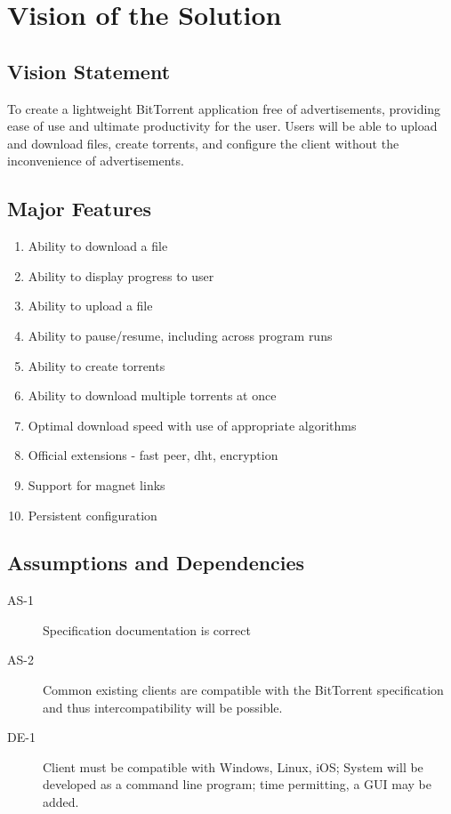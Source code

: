\documentclass[letter]{scrartcl}
\begin{document}
\section{Vision of the Solution}
\subsection{Vision Statement}
To create a lightweight BitTorrent application free of advertisements, providing ease of use and ultimate productivity for the user.  Users will be able to upload and download files, create torrents, and configure the client without the inconvenience of advertisements.
\subsection{Major Features}
\begin{enumerate}
\item Ability to download a file
\item Ability to display progress to user
\item Ability to upload a file
\item Ability to pause/resume, including across program runs
\item Ability to create torrents
\item Ability to download multiple torrents at once
\item Optimal download speed with use of appropriate algorithms
\item Official extensions - fast peer, dht, encryption
\item Support for magnet links
\item Persistent configuration
\end{enumerate}

\subsection{Assumptions and Dependencies}
\begin{description}
\item[AS-1] Specification documentation is correct
\item[AS-2] Common existing clients are compatible with the BitTorrent specification and thus intercompatibility will be possible.
\item[DE-1] Client must be compatible with Windows, Linux, iOS;
System will be developed as a command line program; time permitting, a GUI may be added.
\end{description}
\end{document}
